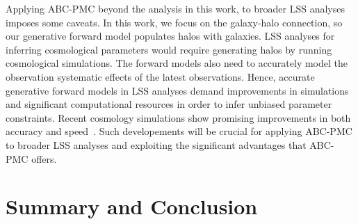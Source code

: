 Applying ABC-PMC beyond the analysis in this work, to broader LSS analyses 
imposes some caveats. In this work, we focus on the galaxy-halo connection, so
our generative forward model populates halos with galaxies. LSS analyses 
for inferring cosmological parameters would require generating halos by 
running cosmological simulations. The forward models also need to accurately 
model the observation systematic effects of the latest observations. Hence, 
accurate generative forward models in LSS analyses demand improvements in simulations 
and significant computational resources in order to infer unbiased parameter 
constraints. Recent cosmology simulations show promising improvements 
in both accuracy and speed~\citep[\emph{e.g.}][]{fastpm}. Such developements
will be crucial for applying ABC-PMC to broader LSS analyses and exploiting 
the significant advantages that ABC-PMC offers.


\section{Summary and Conclusion}\label{sec:discussion}

